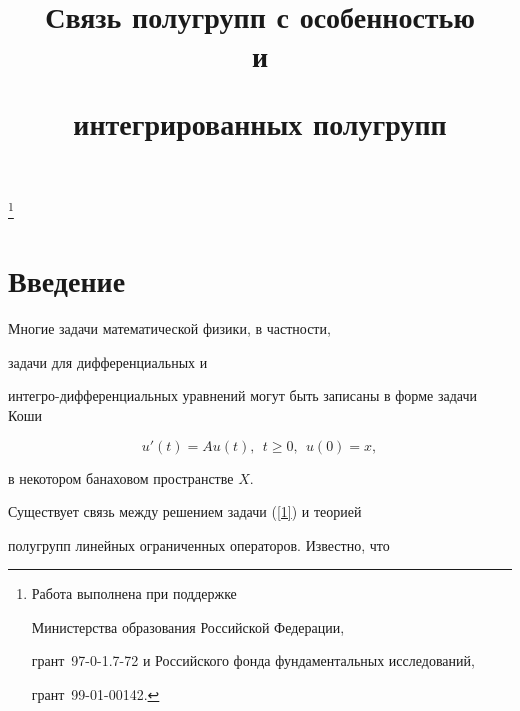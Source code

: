 \title{Связь полугрупп с особенностью\\ и


интегрированных полугрупп}


\thanks{Работа выполнена при поддержке 


Министерства образования Российской Федерации,


грант \No\,97-0-1.7-72 и Российского фонда фундаментальных исследований,


грант \No\,99-01-00142.}





\date{}




\pagestyle{plain} %







\maketitle


\label{begin}











\section*{Введение}





Многие задачи математической физики, в частности, 


задачи для дифференциальных и


интегро-дифференциальных уравнений могут быть записаны в форме задачи Коши 


\begin{equation}\label{1}


u'(t)=Au(t),\ \ t\geq 0,\ \ u(0)=x,


\end{equation}


в некотором банаховом пространстве $X$.


Существует связь между решением задачи (\ref{1}) и теорией 


полугрупп линейных ограниченных операторов.  Известно, что


